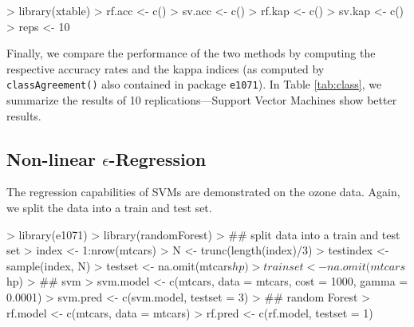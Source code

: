 \documentclass[a4paper]{article}
\newcommand{\pkg}[1]{\texttt{#1}}
\begin{document}
\begin{Schunk}
\end{Schunk}


\begin{Schunk}
\begin{Sinput}
> library(xtable)
> rf.acc <- c()
> sv.acc <- c()
> rf.kap <- c()
> sv.kap <- c()
> reps <- 10
\end{Sinput}
\end{Schunk}
\noindent Finally, we compare the performance of the two methods by computing the 
respective accuracy rates and the kappa indices (as computed by \texttt{classAgreement()}
also contained in package \pkg{e1071}). In Table \ref{tab:class}, we
summarize the results of 10 replications---Support Vector Machines show better results.

\subsection*{Non-linear $\epsilon$-Regression}

The regression capabilities of SVMs are demonstrated on the
ozone data. Again, we split the data
into a train and test set.

\begin{Schunk}
\begin{Sinput}
> library(e1071)
> library(randomForest)
> ## split data into a train and test set
> index     <- 1:nrow(mtcars)
> N         <- trunc(length(index)/3)
> testindex <- sample(index, N)
> testset   <- na.omit(mtcars$hp)
> trainset  <- na.omit(mtcars$hp)
> ## svm
> svm.model <- c(mtcars, data = mtcars, cost = 1000, gamma = 0.0001)
> svm.pred  <- c(svm.model, testset = 3)
> ## random Forest
> rf.model <- c(mtcars, data = mtcars)
> rf.pred  <- c(rf.model, testset = 1)
\end{Sinput}
\end{Schunk}
\end{document}
